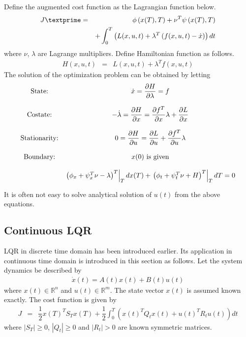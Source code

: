 Define the augmented cost function as the Lagrangian function below.
\begin{eqnarray}
	J\textprime &=& \phi\left(x(T),T\right) + \nu^T\psi\left(x(T),T\right) \nonumber \\
	&& + \int_{0}^{T}\left(L(x, u, t) + \lambda^T\left(f(x, u, t) - \dot{x}\right)\right)dt \nonumber
\end{eqnarray}
where $\nu$, $\lambda$ are Lagrange multipliers. Define Hamiltonian function as follows.
\begin{eqnarray}
	H(x,u,t) &=& L(x, u, t) + \lambda^Tf(x, u, t) \nonumber
\end{eqnarray}
The solution of the optimization problem can be obtained by letting
\begin{eqnarray}
	\begin{array}{cc}
		\textup{State:} & \dot{x} = \dfrac{\partial H}{\partial \lambda} = f \\ & \\
		\textup{Costate:} & -\dot{\lambda} = \dfrac{\partial H}{\partial x} = \dfrac{\partial f^T}{\partial x}\lambda + \dfrac{\partial L}{\partial x} \\ & \\
		\textup{Stationarity:} & 0 = \dfrac{\partial H}{\partial u} = \dfrac{\partial L}{\partial u} + \dfrac{\partial f^T}{\partial u}\lambda \\ & \\
		\textup{Boundary:} & x(0)\textup{~is given} \\ & \\
		& \left.\left(\phi_x+\psi_x^T\nu-\lambda\right)^T\right|_{T}dx(T) + \left.\left(\phi_t+\psi_t^T\nu+H\right)^T\right|_{T}dT = 0
	\end{array} \nonumber
\end{eqnarray}

It is often not easy to solve analytical solution of $u(t)$ from the above equations.

\subsection{Continuous LQR}

LQR in discrete time domain has been introduced earlier. Its application in continuous time domain is introduced in this section as follows. Let the system dynamics be described by
\begin{eqnarray}
	\dot{x}(t) = A(t)x(t) + B(t)u(t) \nonumber
\end{eqnarray}
where $x(t)\in\mathbb{R}^n$ and $u(t)\in\mathbb{R}^m$. The state vector $x(t)$ is assumed known exactly. The cost function is given by
\begin{eqnarray}
  J &=& \dfrac{1}{2}x(T)^TS_Tx(T) + \dfrac{1}{2}\int_{0}^{T}\left(x(t)^TQ_tx(t) + u(t)^TR_tu(t)\right)dt \nonumber
\end{eqnarray}
where $|S_T|\geq 0$, $|Q_t| \geq 0$ and $|R_t| >0$ are known symmetric matrices.

